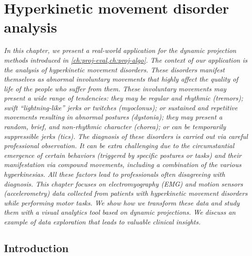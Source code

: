 \chapter{Hyperkinetic movement disorder analysis}
\label{ch:nemo}

\textit{
In this chapter, we present a real-world application for the dynamic projection methods introduced in \cref{ch:proj-eval,ch:proj-algo}. The context of our application is the analysis of hyperkinetic movement disorders. These disorders manifest themselves as abnormal involuntary movements that highly affect the quality of life of the people who suffer from them. These involuntary movements may present a wide range of tendencies: they may be regular and rhythmic (tremors); swift ``lightning-like'' jerks or twitches (myoclonus); or sustained and repetitive movements resulting in abnormal postures (dystonia); they may present a random, brief, and non-rhythmic character (chorea); or can be temporarily suppressible jerks (tics). The diagnosis of these disorders is carried out via careful professional observation. It can be extra challenging due to the circumstantial emergence of certain behaviors (triggered by specific postures or tasks) and their manifestation via compound movements, including a combination of the various hyperkinesias. All these factors lead to professionals often disagreeing with diagnosis. 
This chapter focuses on electromyography (EMG) and motion sensors (accelerometry) data collected from patients with hyperkinetic movement disorders while performing motor tasks. We show how we transform these data and study them with a visual analytics tool based on dynamic projections. We discuss an example of data exploration that leads to valuable clinical insights.
}

\vspace{5mm} %



\section{Introduction}


